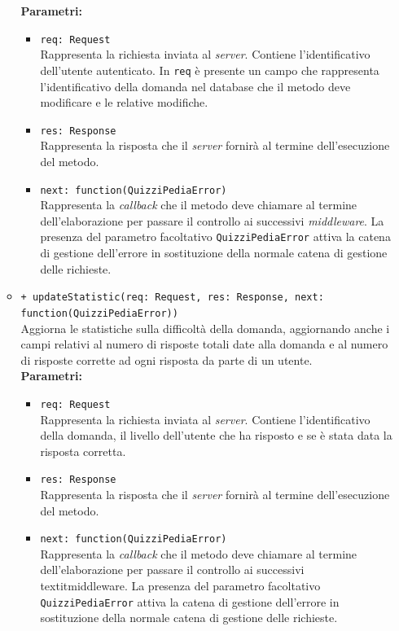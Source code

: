 \begin{itemize}
\begin{itemize}
				\textbf{Parametri:}
					\begin{itemize}
						\item \texttt{req: Request} \\
						Rappresenta la richiesta inviata al \textit{server}. Contiene l'identificativo dell'utente autenticato. In \texttt{req} è presente un campo che rappresenta l'identificativo della domanda nel database che il metodo deve modificare e le relative modifiche.
						\item \texttt{res: Response} \\
						Rappresenta la risposta che il \textit{server} fornirà al termine dell'esecuzione del metodo.
						\item \texttt{next: function(QuizziPediaError)} \\
						Rappresenta la \textit{callback} che il metodo deve chiamare al termine dell'elaborazione per passare il controllo ai successivi \textit{middleware}. La presenza del parametro facoltativo \texttt{QuizziPediaError} attiva la catena di gestione dell'errore in sostituzione della normale catena di gestione delle richieste.
					\end{itemize}
				\item \texttt{+ updateStatistic(req: Request, res: Response, next: function(QuizziPediaError))} \\
				Aggiorna le statistiche sulla difficoltà della domanda, aggiornando anche i campi relativi al numero di risposte totali date alla domanda e al numero di risposte corrette ad ogni risposta da parte di un utente. \\
				\textbf{Parametri:}
					\begin{itemize}
						\item \texttt{req: Request} \\
						Rappresenta la richiesta inviata al \textit{server}. Contiene l'identificativo della domanda, il livello dell'utente che ha risposto e se è stata data la risposta corretta.
						\item \texttt{res: Response} \\
						Rappresenta la risposta che il \textit{server} fornirà al termine dell'esecuzione del metodo.
						\item \texttt{next: function(QuizziPediaError)} \\
						Rappresenta la \textit{callback} che il metodo deve chiamare al termine dell'elaborazione per passare il controllo ai successivi textit{middleware}. La presenza del parametro facoltativo \texttt{QuizziPediaError} attiva la catena di gestione dell'errore in sostituzione della normale catena di gestione delle richieste.
					\end{itemize}
			\end{itemize}
	\end{itemize}